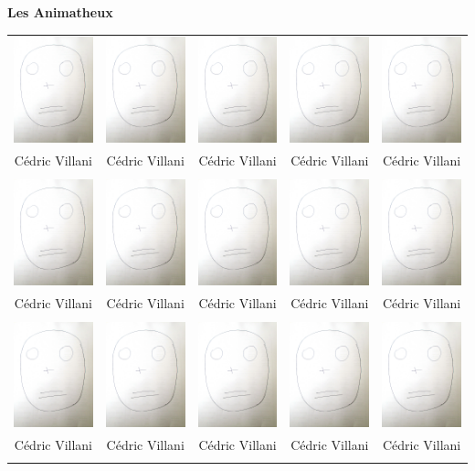 \vspace {-2cm}

\pagestyle {plain}


\begin{center}
 \huge{\textbf{Les Animatheux} }
 \end{center} 
 
 \vspace {-0.5cm}


\begin{center}
\begin{tabular}{ccccc}
  
 
   \includegraphics[width=\ssspas ]{vide.jpg} &\includegraphics[width=\ssspas ]{vide.jpg}  & \includegraphics[width=\ssspas ]{vide.jpg} & \includegraphics[width=\ssspas]{vide.jpg}  & \includegraphics[width=\ssspas]{vide.jpg}   \\ Cédric Villani & Cédric Villani & Cédric Villani & Cédric Villani & Cédric Villani \\  \\
   
   
   \includegraphics[width=\ssspas ]{vide.jpg} &\includegraphics[width=\ssspas ]{vide.jpg}  & \includegraphics[width=\ssspas ]{vide.jpg} & \includegraphics[width=\ssspas]{vide.jpg}  & \includegraphics[width=\ssspas]{vide.jpg}   \\ Cédric Villani & Cédric Villani & Cédric Villani & Cédric Villani & Cédric Villani \\  \\
 
      
   \includegraphics[width=\ssspas ]{vide.jpg} &\includegraphics[width=\ssspas ]{vide.jpg}  & \includegraphics[width=\ssspas ]{vide.jpg} & \includegraphics[width=\ssspas]{vide.jpg}  & \includegraphics[width=\ssspas]{vide.jpg}   \\ Cédric Villani & Cédric Villani & Cédric Villani & Cédric Villani & Cédric Villani \\  \\


\end{tabular}


%
%
%
%
%          
%  
%  

\end{center}


\pagebreak